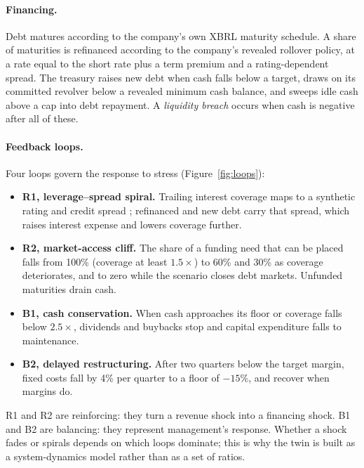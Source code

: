 \paragraph{Financing.} Debt matures according to the company's own XBRL maturity schedule. A share of maturities is refinanced according to the company's revealed rollover policy, at a rate equal to the short rate plus a term premium and a rating-dependent spread. The treasury raises new debt when cash falls below a target, draws on its committed revolver below a revealed minimum cash balance, and sweeps idle cash above a cap into debt repayment. A \emph{liquidity breach} occurs when cash is negative after all of these.

\paragraph{Feedback loops.} Four loops govern the response to stress (Figure~\ref{fig:loops}):
\begin{itemize}
\item \textbf{R1, leverage--spread spiral.} Trailing interest coverage maps to a synthetic rating and credit spread \citep{damodaran2026}; refinanced and new debt carry that spread, which raises interest expense and lowers coverage further.
\item \textbf{R2, market-access cliff.} The share of a funding need that can be placed falls from 100\% (coverage at least $1.5\times$) to 60\% and 30\% as coverage deteriorates, and to zero while the scenario closes debt markets. Unfunded maturities drain cash.
\item \textbf{B1, cash conservation.} When cash approaches its floor or coverage falls below $2.5\times$, dividends and buybacks stop and capital expenditure falls to maintenance.
\item \textbf{B2, delayed restructuring.} After two quarters below the target margin, fixed costs fall by 4\% per quarter to a floor of $-15\%$, and recover when margins do.
\end{itemize}
R1 and R2 are reinforcing: they turn a revenue shock into a financing shock. B1 and B2 are balancing: they represent management's response. Whether a shock fades or spirals depends on which loops dominate; this is why the twin is built as a system-dynamics model \citep{forrester1961,sterman2000,morecroft2015} rather than as a set of ratios.

